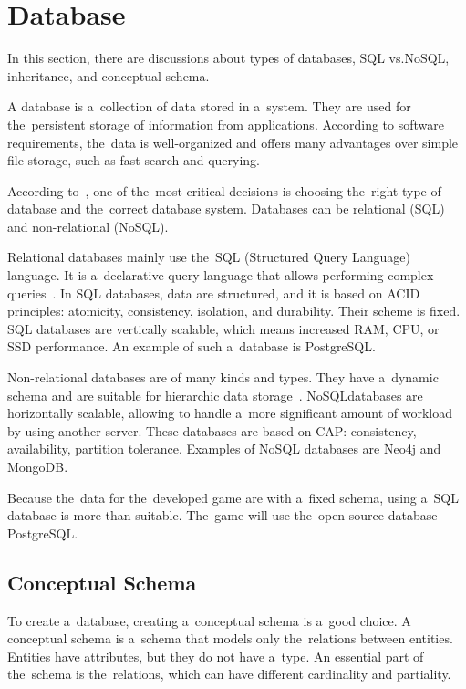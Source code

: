 \section{Database}

In this section, there are discussions about types of databases, SQL vs.\linebreak{}NoSQL, inheritance, and conceptual schema.

A database is a~collection of data stored in a~system.
They are used for the~persistent storage of information from applications.
According to software requirements, the~data is well-organized and offers many advantages over simple file storage, such as fast search and querying.

According to~\cite{a2018_difference_db}, one of the~most critical decisions is choosing the~right type of database and the~correct database system.
Databases can be relational (SQL) and non-relational (NoSQL).

\pagebreak

Relational databases mainly use the~SQL (Structured Query Language) language.
It is a~declarative query language that allows performing complex queries~\cite{a2018_difference_db}.
In SQL databases, data are structured, and it is based on ACID principles: atomicity, consistency, isolation, and durability.
Their scheme is fixed.
SQL databases are vertically scalable, which means increased RAM, CPU, or SSD performance.
An example of such a~database is PostgreSQL.

Non-relational databases are of many kinds and types.
They have a~dynamic schema and are suitable for hierarchic data storage~\cite{a2018_difference_db}.
NoSQL\linebreak{}databases are horizontally scalable, allowing to handle a~more significant amount of workload by using another server.
These databases are based on CAP: consistency, availability, partition tolerance.
Examples of NoSQL databases are Neo4j and MongoDB.

Because the~data for the~developed game are with a~fixed schema, using a~SQL database is more than suitable.
The~game will use the~open-source database PostgreSQL.

\subsection{Conceptual Schema}
\label{design:conceptual}

To create a~database, creating a~conceptual schema is a~good choice.
A conceptual schema is a~schema that models only the~relations between entities.
Entities have attributes, but they do not have a~type.
An essential part of the~schema is the~relations, which can have different cardinality and partiality.

